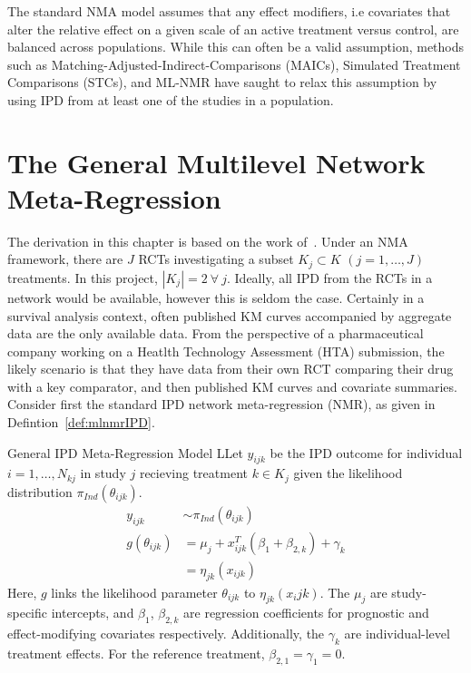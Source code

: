 The standard NMA model assumes that any effect modifiers, i.e covariates that alter the relative effect on a given scale of an active treatment versus control, are balanced across populations. While this can often be a valid assumption, methods such as Matching-Adjusted-Indirect-Comparisons (MAICs), Simulated Treatment Comparisons (STCs), and ML-NMR have saught to relax this assumption by using IPD from at least one of the studies in a population.

\section{The General Multilevel Network Meta-Regression}
The derivation in this chapter is based on the work of~\cite{phillippo2024}. Under an NMA framework, there are $J$ RCTs investigating a subset $K_j \subset K$ $(j = 1,\ldots,J)$ treatments. In this project, $|K_j| = 2 \ \forall \ j$. Ideally, all IPD from the RCTs in a network would be available, however this is seldom the case. Certainly in a survival analysis context, often published KM curves accompanied by aggregate data are the only available data. From the perspective of a pharmaceutical company working on a Heatlth Technology Assessment (HTA) submission, the likely scenario is that they have data from their own RCT comparing their drug with a key comparator, and then published KM curves and covariate summaries. Consider first the standard IPD network meta-regression (NMR), as given in Defintion~\ref{def:mlnmrIPD}.

\begin{definition}{General IPD Meta-Regression Model}
    LLet $y_{ijk}$ be the IPD outcome for individual $i = 1, \ldots, N_{kj}$ in study $j$ recieving treatment $k \in K_j$ given the likelihood distribution $\pi_{Ind}(\theta_{ijk})$. 
    \begin{align*}
        y_{ijk} &\sim \pi_{Ind}(\theta_{ijk}) \\
        g(\theta_{ijk}) &= \mu_j + x^T_{ijk}(\beta_1 + \beta_{2,k}) + \gamma_k \\
                        &= \eta_{jk}(x_{ijk})
    \end{align*}
    Here, $g$ links the likelihood parameter $\theta_{ijk}$ to $\eta_{jk}(x_ijk)$. The $\mu_j$ are study-specific intercepts, and $\beta_1$, $\beta_{2,k}$ are regression coefficients for prognostic and effect-modifying covariates respectively. Additionally, the $\gamma_k$ are individual-level treatment effects. For the reference treatment, $\beta_{2,1} = \gamma_1 = 0$.
    \label{def:mlnmrIPD}
\end{definition}

